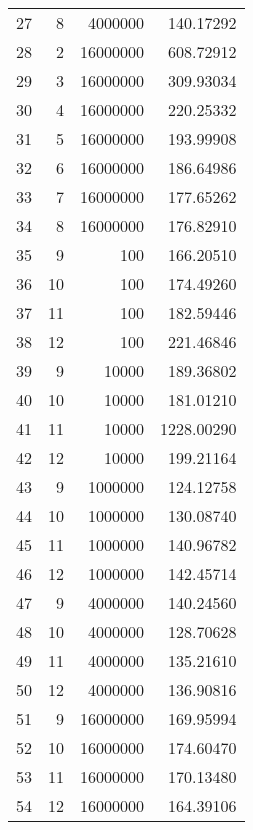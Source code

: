 \begin{tabular}{lrrr}
27 &              8 &     4000000 &     140.17292 \\
28 &              2 &    16000000 &     608.72912 \\
29 &              3 &    16000000 &     309.93034 \\
30 &              4 &    16000000 &     220.25332 \\
31 &              5 &    16000000 &     193.99908 \\
32 &              6 &    16000000 &     186.64986 \\
33 &              7 &    16000000 &     177.65262 \\
34 &              8 &    16000000 &     176.82910 \\
35 &              9 &         100 &     166.20510 \\
36 &             10 &         100 &     174.49260 \\
37 &             11 &         100 &     182.59446 \\
38 &             12 &         100 &     221.46846 \\
39 &              9 &       10000 &     189.36802 \\
40 &             10 &       10000 &     181.01210 \\
41 &             11 &       10000 &    1228.00290 \\
42 &             12 &       10000 &     199.21164 \\
43 &              9 &     1000000 &     124.12758 \\
44 &             10 &     1000000 &     130.08740 \\
45 &             11 &     1000000 &     140.96782 \\
46 &             12 &     1000000 &     142.45714 \\
47 &              9 &     4000000 &     140.24560 \\
48 &             10 &     4000000 &     128.70628 \\
49 &             11 &     4000000 &     135.21610 \\
50 &             12 &     4000000 &     136.90816 \\
51 &              9 &    16000000 &     169.95994 \\
52 &             10 &    16000000 &     174.60470 \\
53 &             11 &    16000000 &     170.13480 \\
54 &             12 &    16000000 &     164.39106 \\
\bottomrule
\end{tabular}
